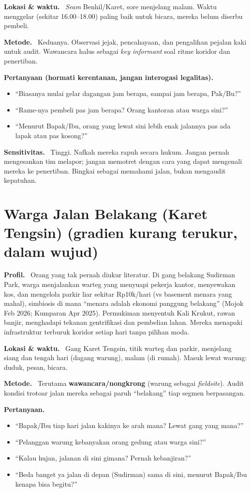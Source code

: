 \documentclass[11pt,a4paper]{report}
\newcommand{\fld}[1]{\smallskip\noindent\textbf{#1.}\ }
\begin{document}
\fld{Lokasi \& waktu} \emph{Seam} Benhil/Karet, sore menjelang malam. Waktu menggelar
(sekitar 16.00--18.00) paling baik untuk bicara, mereka belum diserbu pembeli.

\fld{Metode} Keduanya. Observasi jejak, pencahayaan, dan pengalihan pejalan kaki untuk
audit. Wawancara halus sebagai \emph{key informant} soal ritme koridor dan penertiban.

\fld{Pertanyaan (hormati kerentanan, jangan interogasi legalitas)}
\begin{itemize}
  \item ``Biasanya mulai gelar dagangan jam berapa, sampai jam berapa, Pak/Bu?''
  \item ``Rame-nya pembeli pas jam berapa? Orang kantoran atau warga sini?''
  \item ``Menurut Bapak/Ibu, orang yang lewat sini lebih enak jalannya pas ada lapak atau pas kosong?''
\end{itemize}

\fld{Sensitivitas} Tinggi. Nafkah mereka rapuh secara hukum. Jangan pernah mengesankan
tim melapor; jangan memotret dengan cara yang dapat mengenali mereka ke penertiban.
Bingkai sebagai memahami jalan, bukan mengaudit kepatuhan.

\section{Warga Jalan Belakang (Karet Tengsin) \textnormal{(gradien kurang terukur, dalam wujud)}}
\fld{Profil} Orang yang tak pernah diukur literatur. Di gang belakang Sudirman Park,
warga menjalankan warteg yang menyuapi pekerja kantor, menyewakan kos, dan mengelola
parkir liar sekitar Rp10k/hari (vs basement menara yang mahal), simbiosis di mana
``menara adalah ekonomi panggung belakang'' (Mojok Feb 2026; Kumparan Apr 2025).
Permukiman menyentuh Kali Krukut, rawan banjir, menghadapi tekanan gentrifikasi dan
pembelian lahan. Mereka menapaki infrastruktur terburuk koridor setiap hari tanpa
pilihan moda.

\fld{Lokasi \& waktu} Gang Karet Tengsin, titik warteg dan parkir, menjelang siang dan
tengah hari (dagang warung), malam (di rumah). Masuk lewat warung: duduk, pesan, bicara.

\fld{Metode} Terutama \textbf{wawancara/nongkrong} (warung sebagai \emph{fieldsite}).
Audit kondisi trotoar jalan mereka sebagai paruh ``belakang'' tiap segmen berpasangan.

\fld{Pertanyaan}
\begin{itemize}
  \item ``Bapak/Ibu tiap hari jalan kakinya ke arah mana? Lewat gang yang mana?''
  \item ``Pelanggan warung kebanyakan orang gedung atau warga sini?''
  \item ``Kalau hujan, jalanan di sini gimana? Pernah kebanjiran?''
  \item ``Beda banget ya jalan di depan (Sudirman) sama di sini, menurut Bapak/Ibu kenapa bisa begitu?''
\end{itemize}
\end{document}

